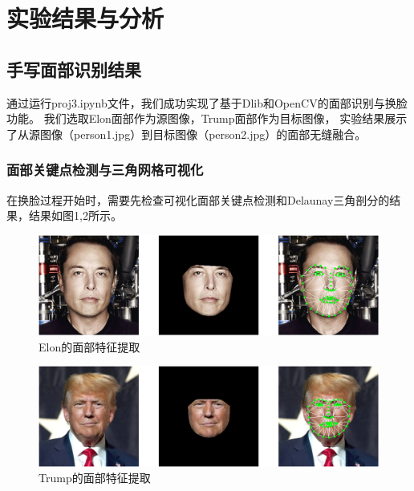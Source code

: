 \section{实验结果与分析}

\subsection{手写面部识别结果}
通过运行proj3.ipynb文件，我们成功实现了基于Dlib和OpenCV的面部识别与换脸功能。
我们选取Elon面部作为源图像，Trump面部作为目标图像，
实验结果展示了从源图像（person1.jpg）到目标图像（person2.jpg）的面部无缝融合。

\subsubsection{面部关键点检测与三角网格可视化}
在换脸过程开始时，需要先检查可视化面部关键点检测和Delaunay三角剖分的结果，结果如图1,2所示。
\begin{figure}
	\centering
	\includegraphics[width=0.7\linewidth]{image/Elon}
	\caption{Elon的面部特征提取}
	\label{图1：}
\end{figure}
\begin{figure}
	\centering
	\includegraphics[width=0.7\linewidth]{image/Trump}
	\caption{Trump的面部特征提取}
	\label{图2：}
\end{figure}


